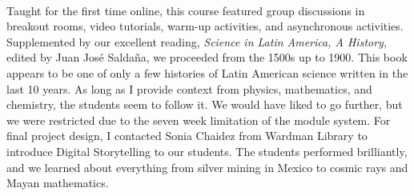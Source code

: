 \documentclass[../../../main.tex]{subfiles}
\begin{document}
\\
\vspace{0.15cm}
Taught for the first time online, this course featured group discussions in breakout rooms, video tutorials, warm-up activities, and asynchronous activities.  Supplemented by our excellent reading, \textit{Science in Latin America, A History}, edited by Juan Jos\'{e} Salda\~{n}a, we proceeded from the 1500s up to 1900.  This book appears to be one of only a few histories of Latin American science written in the last 10 years.  As long as I provide context from physics, mathematics, and chemistry, the students seem to follow it.  We would have liked to go further, but we were restricted due to the seven week limitation of the module system.  For final project design, I contacted Sonia Chaidez from Wardman Library to introduce Digital Storytelling to our students.  The students performed brilliantly, and we learned about everything from silver mining in Mexico to cosmic rays and Mayan mathematics.
\end{document}
